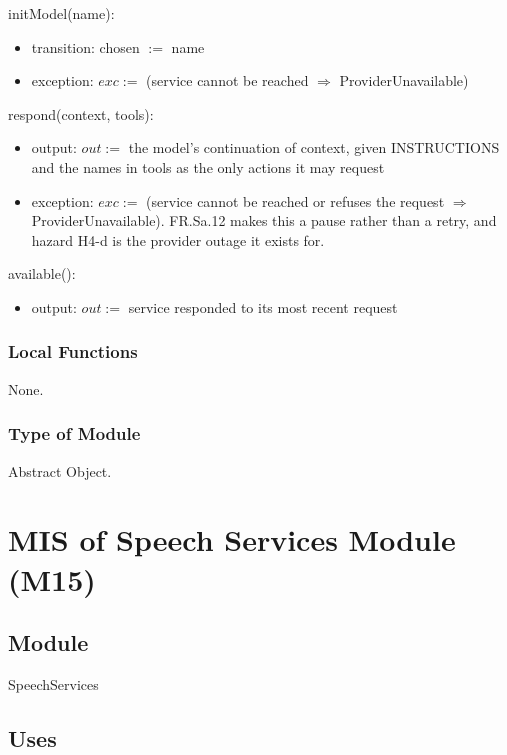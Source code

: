 \documentclass[12pt, titlepage]{article}
\begin{document}
\noindent initModel(name):
\begin{itemize}
\item transition: chosen $:=$ name
\item exception: $exc :=$ (service cannot be reached $\Rightarrow$
ProviderUnavailable)
\end{itemize}

\noindent respond(context, tools):
\begin{itemize}
\item output: $out :=$ the model's continuation of context, given INSTRUCTIONS
and the names in tools as the only actions it may request
\item exception: $exc :=$ (service cannot be reached or refuses the request
$\Rightarrow$ ProviderUnavailable). FR.Sa.12 makes this a pause rather than a
retry, and hazard H4-d is the provider outage it exists for.
\end{itemize}

\noindent available():
\begin{itemize}
\item output: $out :=$ service responded to its most recent request
\end{itemize}

\subsubsection{Local Functions}

None.

\subsubsection{Type of Module}

Abstract Object.

\newpage

\section{MIS of Speech Services Module (M15)} \label{mod:speech}

\subsection{Module}

SpeechServices

\subsection{Uses}
\end{document}
